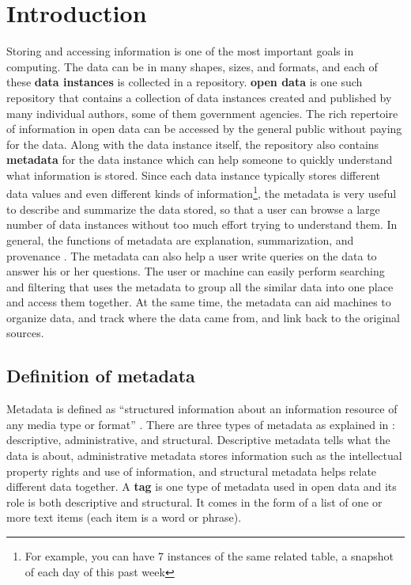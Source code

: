 
\chapter{Introduction}
\label{ch:Introduction}

Storing and accessing information is one of the most important goals in computing. The data can be in many shapes, sizes, and formats, and each of these \textbf{\glspl{data instance}} is collected in a repository. \textbf{\Gls{open data}} is one such repository that contains a collection of data instances created and published by many individual authors, some of them government agencies. The rich repertoire of information in open data can be accessed by the general public without paying for the data. Along with the data instance itself, the repository also contains \textbf{\gls{metadata}} for the data instance which can help someone to quickly understand what information is stored. Since each data instance typically stores different data values and even different kinds of information\footnote{For example, you can have 7 instances of the same related table, a snapshot of each day of this past week}, the metadata is very useful to describe and summarize the data stored, so that a user can browse a large number of data instances without too much effort trying to understand them. In general, the functions of metadata are explanation, summarization, and provenance \cite{10.1145/2845915}. The metadata can also help a user write queries on the data to answer his or her questions. The user or machine can easily perform searching and filtering that uses the metadata to group all the similar data into one place and access them together. At the same time, the metadata can aid machines to organize data, and track where the data came from, and link back to the original sources.

\section{Definition of metadata}
\label{sec:DefinitionOfMetadata}

Metadata is defined as “structured information about an information resource of any media type or format” \cite{Feltner2023Metadata}. There are three types of metadata as explained in \cite{Baca2008}: descriptive, administrative, and structural. Descriptive metadata tells what the data is about, administrative metadata stores information such as the intellectual property rights and use of information, and structural metadata helps relate different data together. A \textbf{\gls{tag}} is one type of metadata used in open data and its role is both descriptive and structural. It comes in the form of a list of one or more text items (each item is a word or phrase).

